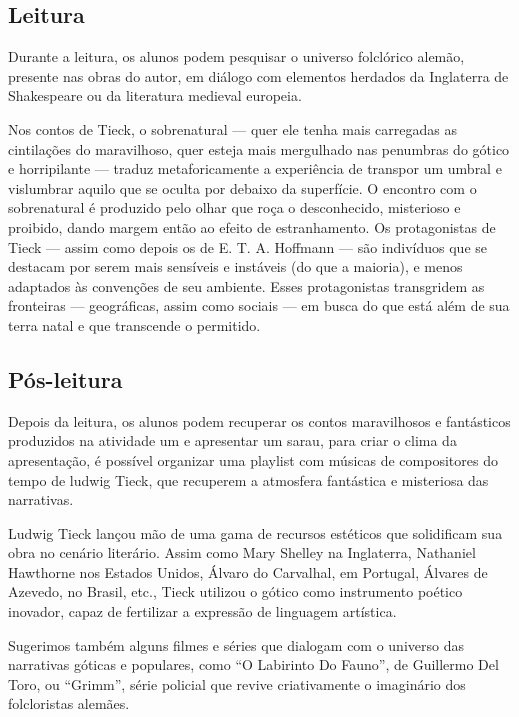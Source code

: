 \documentclass[11pt]{extarticle}
\begin{document}
\subsection{Leitura}

Durante a leitura, os alunos podem pesquisar o universo
folclórico alemão, presente nas obras do autor, em diálogo com elementos
herdados da Inglaterra de Shakespeare ou da literatura medieval
europeia.

Nos contos de Tieck, o sobrenatural --- quer ele tenha mais carregadas
as cintilações do maravilhoso, quer esteja mais mergulhado nas penumbras
do gótico e horripilante --- traduz metaforicamente a experiência de
transpor um umbral e vislumbrar aquilo que se oculta por debaixo da
superfície. O encontro com o sobrenatural é produzido pelo olhar que
roça o desconhecido, misterioso e proibido, dando margem então ao efeito
de estranhamento. Os protagonistas de Tieck --- assim como depois os de
E. T. A. Hoffmann --- são indivíduos que se destacam por serem mais
sensíveis e instáveis (do que a maioria), e menos adaptados às
convenções de seu ambiente. Esses protagonistas transgridem as
fronteiras --- geográficas, assim como sociais --- em busca do que está
além de sua terra natal e que transcende o permitido.


\subsection{Pós-leitura}

Depois da leitura, os alunos podem recuperar os contos
maravilhosos e fantásticos produzidos na atividade um e apresentar um
sarau, para criar o clima da apresentação, é possível organizar uma
playlist com músicas de compositores do tempo de ludwig Tieck, que
recuperem a atmosfera fantástica e misteriosa das narrativas.

Ludwig Tieck lançou mão de uma gama de recursos estéticos que
solidificam sua obra no cenário literário. Assim como Mary Shelley na
Inglaterra, Nathaniel Hawthorne nos Estados Unidos, Álvaro do Carvalhal,
em Portugal, Álvares de Azevedo, no Brasil, etc., Tieck utilizou o
gótico como instrumento poético inovador, capaz de fertilizar a
expressão de linguagem artística.

Sugerimos também alguns filmes e séries que dialogam com o universo das
narrativas góticas e populares, como ``O Labirinto Do Fauno'', de
Guillermo Del Toro, ou ``Grimm'', série policial que revive
criativamente o imaginário dos folcloristas alemães.
\end{document}
